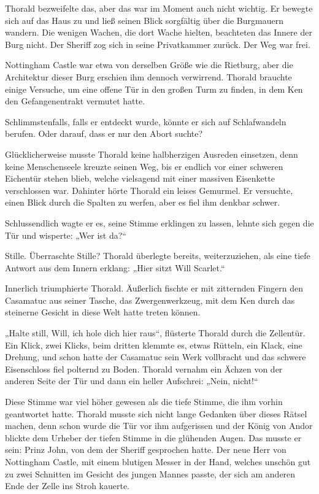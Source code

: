 Thorald bezweifelte das, aber das war im Moment auch nicht wichtig. Er bewegte sich auf das Haus zu und ließ seinen Blick sorgfältig über die Burgmauern wandern. Die wenigen Wachen, die dort Wache hielten, beachteten das Innere der Burg nicht. Der Sheriff zog sich in seine Privatkammer zurück. Der Weg war frei.

Nottingham Castle war etwa von derselben Größe wie die Rietburg, aber die Architektur dieser Burg erschien ihm dennoch verwirrend. Thorald brauchte einige Versuche, um eine offene Tür in den großen Turm zu finden, in dem Ken den Gefangenentrakt vermutet hatte.

Schlimmstenfalls, falls er entdeckt wurde, könnte er sich auf Schlafwandeln berufen. Oder darauf, dass er nur den Abort suchte?

Glücklicherweise musste Thorald keine halbherzigen Ausreden einsetzen, denn keine Menschenseele kreuzte seinen Weg, bis er endlich vor einer schweren Eichentür stehen blieb, welche vielsagend mit einer massiven Eisenkette verschlossen war. Dahinter hörte Thorald ein leises Gemurmel. Er versuchte, einen Blick durch die Spalten zu werfen, aber es fiel ihm denkbar schwer.

Schlussendlich wagte er es, seine Stimme erklingen zu lassen, lehnte sich gegen die Tür und wisperte: „Wer ist da?“

Stille. Überraschte Stille? Thorald überlegte bereits, weiterzuziehen, als eine tiefe Antwort aus dem Innern erklang: „Hier sitzt Will Scarlet.“

Innerlich triumphierte Thorald. Äußerlich fischte er mit zitternden Fingern den Casamatuc aus seiner Tasche, das Zwergenwerkzeug, mit dem Ken durch das steinerne Gesicht in diese Welt hatte treten können.

„Halte still, Will, ich hole dich hier raus“, flüsterte Thorald durch die Zellentür. Ein Klick, zwei Klicks, beim dritten klemmte es, etwas Rütteln, ein Klack, eine Drehung, und schon hatte der Casamatuc sein Werk vollbracht und das schwere Eisenschloss fiel polternd zu Boden. Thorald vernahm ein Ächzen von der anderen Seite der Tür und dann ein heller Aufschrei: „Nein, nicht!“

Diese Stimme war viel höher gewesen als die tiefe Stimme, die ihm vorhin geantwortet hatte. Thorald musste sich nicht lange Gedanken über dieses Rätsel machen, denn schon wurde die Tür vor ihm aufgerissen und der König von Andor blickte dem Urheber der tiefen Stimme in die glühenden Augen. Das musste er sein: Prinz John, von dem der Sheriff gesprochen hatte. Der neue Herr von Nottingham Castle, mit einem blutigen Messer in der Hand, welches unschön gut zu zwei Schnitten im Gesicht des jungen Mannes passte, der sich am anderen Ende der Zelle ins Stroh kauerte.

